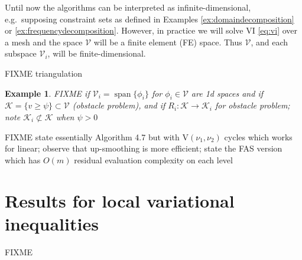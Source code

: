 \documentclass[letterpaper,final,12pt,reqno]{amsart}
\theoremstyle{cstyle}
\theoremstyle{dstyle}
\newtheorem{example}[theorem]{Example}
\numberwithin{equation}{section}
\numberwithin{figure}{section}
\numberwithin{table}{section}
\numberwithin{theorem}{section}
\newcommand{\cK}{\mathcal{K}}
\newcommand{\cV}{\mathcal{V}}
\newcommand{\Span}{\operatorname{span}}
\begin{document}
Until now the algorithms can be interpreted as infinite-dimensional, e.g.~supposing constraint sets as defined in Examples \ref{ex:domaindecomposition} or \ref{ex:frequencydecomposition}.  However, in practice we will solve VI \eqref{eq:vi} over a mesh and the space $\cV$ will be a finite element (FE) space.  Thus $\cV$, and each subspace $\cV_i$, will be finite-dimensional.

FIXME triangulation

\begin{example}  FIXME if $\cV_i=\Span\{\phi_i\}$ for $\phi_i\in\cV$ are 1d spaces and if $\cK = \{v \ge \psi\} \subset \cV$ (obstacle problem), and if $R_i : \cK \to \cK_i$ for obstacle problem; note $\cK_i \not\subset \cK$ when $\psi>0$
\end{example}

FIXME state essentially Algorithm 4.7 \cite{GraeserKornhuber2009} but with $\text{V}(\nu_1,\nu_2)$ cycles which works for linear; observe that up-smoothing is more efficient; state the FAS version which has $O(m)$ residual evaluation complexity on each level


\section{Results for local variational inequalities} \label{sec:results}

FIXME





\small


\end{document}
